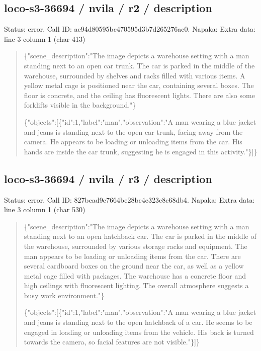 \documentclass[10pt,a4paper]{article}
\begin{document}
\subsection*{loco-s3-36694 / nvila / r2 / description}
Status: error. Call ID: ac94d80595bc470595d3b7d265276ac0. Napaka: Extra data: line 3 column 1 (char 413)
\begin{quote}\footnotesize
\{"scene\_description":\allowbreak{}"The image depicts a warehouse setting with a man standing next to an open car trunk. The car is parked in the middle of the warehouse,\allowbreak{} surrounded by shelves and racks filled with various items. A yellow metal cage is positioned near the car,\allowbreak{} containing several boxes. The floor is concrete,\allowbreak{} and the ceiling has fluorescent lights. There are also some forklifts visible in the background."\}\par
\par
\{"objects":\allowbreak{}[\{"id":\allowbreak{}1,\allowbreak{}"label":\allowbreak{}"man\allowbreak{}",\allowbreak{}"observation":\allowbreak{}"A man wearing a blue jacket and jeans is standing next to the open car trunk,\allowbreak{} facing away from the camera. He appears to be loading or unloading items from the car. His hands are inside the car trunk,\allowbreak{} suggesting he is engaged in this activity."\}]\}
\end{quote}
\subsection*{loco-s3-36694 / nvila / r3 / description}
Status: error. Call ID: 827bcad9e7664be28bc4e323c8c68db4. Napaka: Extra data: line 3 column 1 (char 530)
\begin{quote}\footnotesize
\{"scene\_description":\allowbreak{}"The image depicts a warehouse setting with a man standing next to an open hatchback car. The car is parked in the middle of the warehouse,\allowbreak{} surrounded by various storage racks and equipment. The man appears to be loading or unloading items from the car. There are several cardboard boxes on the ground near the car,\allowbreak{} as well as a yellow metal cage filled with packages. The warehouse has a concrete floor and high ceilings with fluorescent lighting. The overall atmosphere suggests a busy work environment."\}\par
\par
\{"objects":\allowbreak{}[\{"id":\allowbreak{}1,\allowbreak{}"label":\allowbreak{}"man\allowbreak{}",\allowbreak{}"observation":\allowbreak{}"A man wearing a blue jacket and jeans is standing next to the open hatchback of a car. He seems to be engaged in loading or unloading items from the vehicle. His back is turned towards the camera,\allowbreak{} so facial features are not visible."\}]\}
\end{quote}
\end{document}
